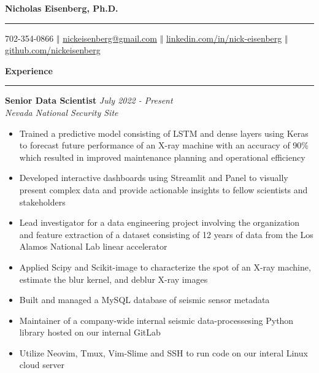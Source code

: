 \documentclass[11pt]{article}
\begin{document}
\thispagestyle{empty}

\begin{center}
  \bf \Huge  Nicholas Eisenberg, Ph.D.
  \vspace{.1em}
  \hrule
\end{center}

\begin{center}
  \vspace{.4em}
  702-354-0866 $\Big \Vert$
  \href{mailto:nickeisenberg@gmail.com}{nickeisenberg@gmail.com} $\Big \Vert$ 
  \href{https://www.linkedin.com/in/nick-eisenberg/}{linkedin.com/in/nick-eisenberg} $\Big \Vert$
  \href{https://github.com/nickeisenberg}{github.com/nickeisenberg}
\end{center}

\textbf{\Large Experience}
\vspace{.3em}
\hrule
\vspace{.3em}

\textbf{\large Senior Data Scientist} \hfill \textit{July 2022 - Present}\\
\textit{Nevada National Security Site} 

\begin{itemize} \setlength\itemsep{-0.5em}
  \item Trained a predictive model consisting of LSTM and dense layers using Keras to forecast
  future performance of an X-ray machine with an accuracy of 90\% which resulted in improved maintenance
  planning and operational efficiency
  \item Developed interactive dashboards using Streamlit and Panel to
  visually present complex data and provide actionable insights to
  fellow scientists and stakeholders
  \item Lead investigator for a data engineering project involving
  the organization and feature extraction of a dataset consisting of
  12 years of data from the Los Alamos National Lab linear accelerator
  \item Applied Scipy and Scikit-image to characterize the spot of an
  X-ray machine, estimate the blur kernel, and deblur X-ray images
  \item Built and managed a MySQL database of seismic sensor metadata
  \item Maintainer of a company-wide internal seismic data-processesing Python library
  hosted on our internal GitLab
  \item Utilize Neovim, Tmux, Vim-Slime and SSH to
  run code on our interal Linux cloud server
\end{itemize}
\end{document}
